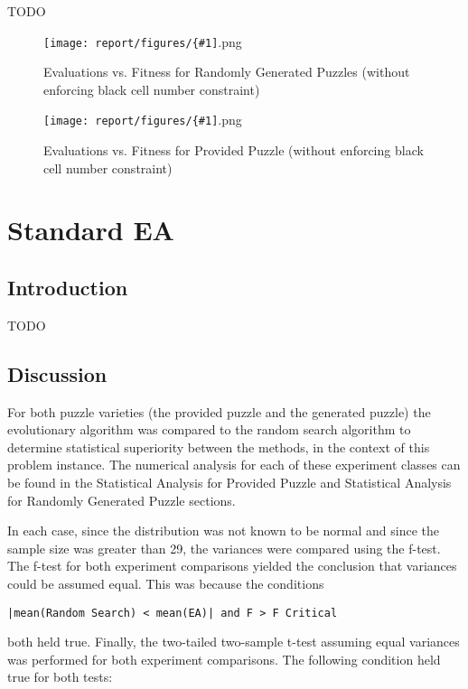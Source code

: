 \documentclass[11pt]{article}
\newcommand{\addgraphic}[1]{\centerline{\texttt{[image: report/figures/\{\#1]}.png}}}
\begin{document}
TODO


\begin{figure}[H]
    \addgraphic{random_gen_soln_graph}
    \caption{Evaluations vs. Fitness for Randomly Generated Puzzles (without enforcing black cell number constraint)}
    \label{fig:rand_search_rand}
\end{figure}

\begin{figure}[H]
    \addgraphic{website_puzzle_soln_graph}
    \caption{Evaluations vs. Fitness for Provided Puzzle (without enforcing black cell number constraint)}
    \label{fig:rand_search_web}
\end{figure}


\section{Standard EA}

\subsection{Introduction}

TODO


\subsection{Discussion}

For both puzzle varieties (the provided puzzle and the generated puzzle) the 
evolutionary algorithm was compared to the random search algorithm to determine 
statistical superiority between the methods, in the context of this problem instance. 
The numerical analysis for each of these experiment classes can be found in the 
Statistical Analysis for Provided Puzzle and Statistical Analysis for Randomly 
Generated Puzzle sections.

In each case, since the distribution was not known to be normal and since the 
sample size was greater than 29, the variances were compared using the f-test. 
The f-test for both experiment comparisons yielded the conclusion that variances 
could be assumed equal. This was because the conditions 

\begin{center}
\texttt{|mean(Random Search) < mean(EA)| and F > F Critical}
\end{center}

both held true. Finally, the two-tailed two-sample t-test assuming equal variances was 
performed for both experiment comparisons. The following condition held true for both 
tests:
\end{document}
